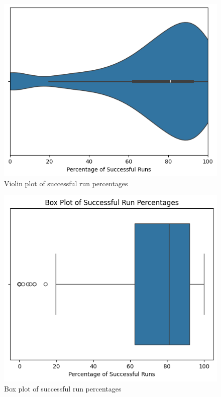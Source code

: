 \documentclass[
	msc, %
	english %
]{../ppgccufmg}
\begin{document}
            \begin{figure}[h]
                \centering
                \includegraphics[scale=0.8]{exemplo/img/violin-plot.png}
                \caption{Violin plot of successful run percentages}
                \label{fig:empirical-violin-plot}
            \end{figure}

            \begin{figure}[h]
                \centering
                \includegraphics[scale=0.8]{exemplo/img/box-plot.png}
                \caption{Box plot of successful run percentages}
                \label{fig:empirical-box-plot}
            \end{figure}
\end{document}
